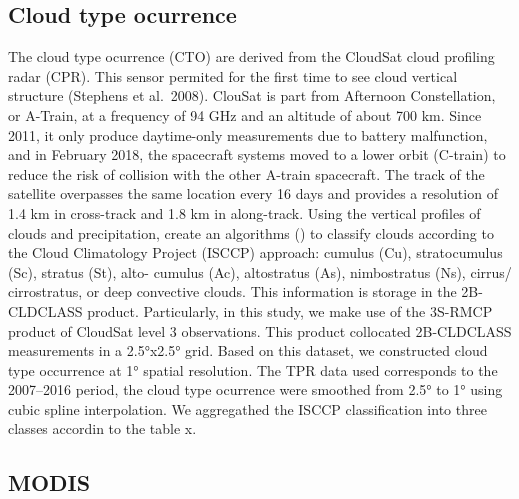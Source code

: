 \documentclass[a4paper, nobind]{templates/cdethesis}
\begin{document}
\hypertarget{cloud-type-ocurrence}{%
\subsection{Cloud type ocurrence}\label{cloud-type-ocurrence}}

The cloud type ocurrence (CTO) are derived from the CloudSat cloud profiling radar (CPR). This sensor permited for the first time to see cloud vertical structure (Stephens et al.~2008). ClouSat is part from Afternoon Constellation, or A-Train, at a frequency of 94 GHz and an altitude of about 700 km. Since 2011, it only produce daytime-only measurements due to battery malfunction, and in February 2018, the spacecraft systems moved to a lower orbit (C-train) to reduce the risk of collision with the other A-train spacecraft. The track of the satellite overpasses the same location every 16 days and provides a resolution of 1.4 km in cross-track and 1.8 km in along-track. Using the vertical profiles of clouds and precipitation, create an algorithms (\cite{}) to classify clouds according to the Cloud Climatology Project (ISCCP) approach: cumulus (Cu), stratocumulus (Sc), stratus (St), alto- cumulus (Ac), altostratus (As), nimbostratus (Ns), cirrus/ cirrostratus, or deep convective clouds. This information is storage in the 2B-CLDCLASS product. Particularly, in this study, we make use of the 3S-RMCP product of CloudSat level 3 observations. This product collocated 2B-CLDCLASS measurements in a 2.5°x2.5° grid. Based on this dataset, we constructed cloud type occurrence at 1° spatial
resolution. The TPR data used corresponds to the 2007--2016 period, the cloud type ocurrence were smoothed from 2.5° to 1° using cubic spline interpolation. We aggregathed the ISCCP classification into three classes accordin to the table x.

\hypertarget{modis}{%
\subsection{MODIS}\label{modis}}
\end{document}
